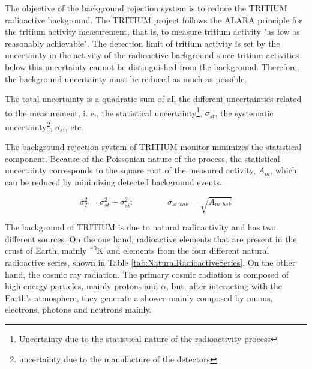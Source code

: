The objective of the background rejection system is to reduce the TRITIUM radioactive background. The TRITIUM project follows the ALARA principle for the tritium activity measurement, that is, to measure tritium activity "as low as reasonably achievable". The detection limit of tritium activity is set by the uncertainty in the activity of the radioactive background since tritium activities below this uncertainty cannot be distinguished from the background. Therefore, the background uncertainty must be reduced as much as possible.

The total uncertainty is a quadratic sum of all the different uncertainties related to the measurement, i. e., the statistical uncertainty\footnote{Uncertainty due to the statistical nature of the radioactivity process}, $\sigma_{st}$, the systematic uncertainty\footnote{uncertainty due to the manufacture of the detectors}, $\sigma_{si}$, etc.

The background rejection system of TRITIUM monitor minimizes the statistical component. Because of the Poissonian nature of the process, the statistical uncertainty corresponds to the square root of the measured activity, $A_{m}$, which can be reduced by minimizing detected background events.

\begin{equation}
\sigma_{T}^2 = \sigma_{st}^2 +\sigma_{si}^2; \qquad \qquad \sigma_{st;bak} = \sqrt{A_{m;bak}}
\label{eq:SquareSumUncerainty}
\end{equation} 

The background of TRITIUM is due to natural radioactivity and has two different sources. On the one hand, radioactive elements that are present in the crust of Earth, mainly $\ce{^{40}K}$ and elements from the four different natural radioactive series, shown in Table \ref{tab:NaturalRadioactiveSeries}. On the other hand, the cosmic ray radiation. The primary cosmic radiation is composed of high-energy particles, mainly protons and $\alpha$, but, after interacting with the Earth's atmosphere, they generate a shower mainly composed by muons, electrons, photons and neutrons mainly.

